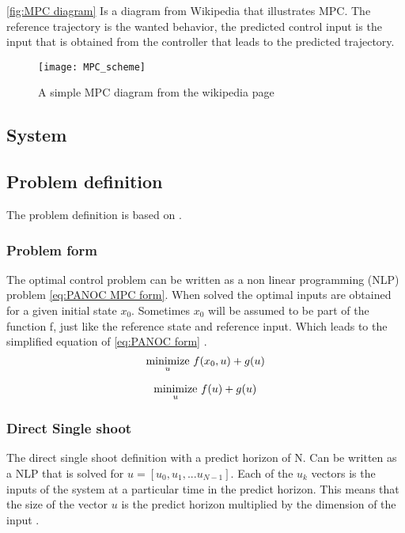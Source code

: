 	\eqref{fig:MPC diagram} Is a diagram from Wikipedia \cite{Wikipedia} that illustrates MPC. The reference trajectory is the wanted behavior, the predicted control input is the input that is obtained from the controller that leads to the predicted trajectory.
	\begin{figure}[h]
		\centering
		\texttt{[image: MPC\_scheme]}
		\caption{A simple MPC diagram from the wikipedia page \cite{Wikipedia}}
		\label{fig:MPC diagram}
	\end{figure}
			
	\subsection{System}
		
	\subsection{Problem definition}
	The problem definition is based on \cite{Diehl2005}.
		\subsubsection{Problem form}
			The optimal control problem can be written as a non linear programming (NLP) problem  \eqref{eq:PANOC MPC form}. When solved the optimal inputs are obtained for a given initial state $x_0$. Sometimes $x_0$ will be assumed to be part of the function f, just like the reference state and reference input. Which leads to the simplified equation of \eqref{eq:PANOC form} .
			\begin{equation}
				\underset{u}{\operatorname*{minimize}} \  f(x_0,u) + g(u)
				\label{eq:PANOC MPC form}
			\end{equation}
			
			\begin{equation}
				\underset{u}{\operatorname*{minimize}} \  f(u) + g(u)
				\label{eq:PANOC form}
			\end{equation}
		\subsubsection{Direct Single shoot}
			The direct single shoot definition with a predict horizon of N. Can be written as a NLP that is solved for $u=[u_0,u_1,... u_{N-1}]$. Each of the $u_k$ vectors is the inputs of the system at a particular time in the predict horizon. This means that the size of the vector $u$ is the predict horizon multiplied by the dimension of the input .
			
